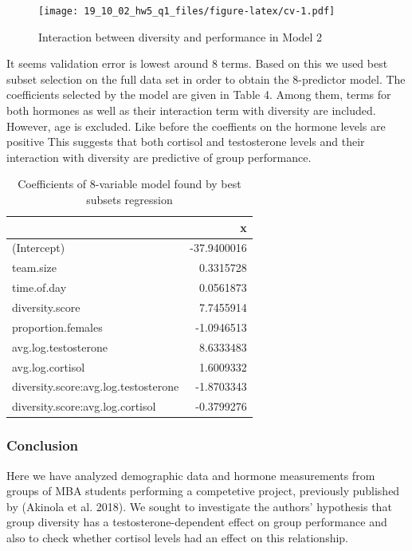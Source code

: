 \documentclass[]{article}
\begin{document}
\begin{figure}
\centering
\texttt{[image: 19\_10\_02\_hw5\_q1\_files/figure-latex/cv-1.pdf]}
\caption{\label{fig:cv} Interaction between diversity and performance in
Model 2}
\end{figure}

It seems validation error is lowest around 8 terms. Based on this we
used best subset selection on the full data set in order to obtain the
8-predictor model. The coefficients selected by the model are given in
Table 4. Among them, terms for both hormones as well as their
interaction term with diversity are included. However, age is excluded.
Like before the coeffients on the hormone levels are positive This
suggests that both cortisol and testosterone levels and their
interaction with diversity are predictive of group performance.

\begin{table}[t]

\caption{\label{tab:unnamed-chunk-5}Coefficients of 8-variable model found by best subsets regression}
\centering
\begin{tabular}{l|r}
\hline
  & x\\
\hline
(Intercept) & -37.9400016\\
\hline
team.size & 0.3315728\\
\hline
time.of.day & 0.0561873\\
\hline
diversity.score & 7.7455914\\
\hline
proportion.females & -1.0946513\\
\hline
avg.log.testosterone & 8.6333483\\
\hline
avg.log.cortisol & 1.6009332\\
\hline
diversity.score:avg.log.testosterone & -1.8703343\\
\hline
diversity.score:avg.log.cortisol & -0.3799276\\
\hline
\end{tabular}
\end{table}

\hypertarget{conclusion}{%
\subsubsection{Conclusion}\label{conclusion}}

Here we have analyzed demographic data and hormone measurements from
groups of MBA students performing a competetive project, previously
published by (Akinola et al. 2018). We sought to investigate the
authors' hypothesis that group diversity has a testosterone-dependent
effect on group performance and also to check whether cortisol levels
had an effect on this relationship.
\end{document}
